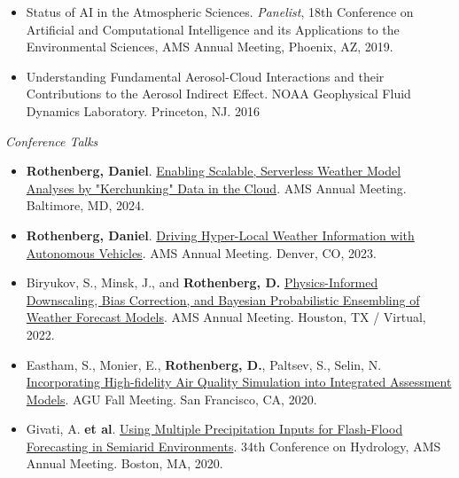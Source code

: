 \documentclass[11pt,letterpaper]{article}
\begin{document}
\begin{itemize}[itemindent=-10pt]
 \item Status of AI in the Atmospheric Sciences. \textit{Panelist}, 18th Conference on Artificial and Computational Intelligence and its Applications to the Environmental Sciences, AMS Annual Meeting, Phoenix, AZ, 2019.
  
\item Understanding Fundamental Aerosol-Cloud Interactions and their Contributions to the Aerosol Indirect Effect. NOAA Geophysical Fluid Dynamics Laboratory. Princeton, NJ. 2016
\end{itemize}

\bigskip
\emph{Conference Talks}
\medskip
\begin{itemize}[itemindent=-10pt]

 \item \textbf{Rothenberg, Daniel}. \href{https://ams.confex.com/ams/104ANNUAL/meetingapp.cgi/Paper/440122}{Enabling Scalable, Serverless Weather Model Analyses by "Kerchunking" Data in the Cloud}. AMS Annual Meeting. Baltimore, MD, 2024.

 \item \textbf{Rothenberg, Daniel}. \href{https://ams.confex.com/ams/103ANNUAL/meetingapp.cgi/Paper/412555}{Driving Hyper-Local Weather Information with Autonomous Vehicles}. AMS Annual Meeting. Denver, CO, 2023.
 
 \item Biryukov, S., Minsk, J., and \textbf{Rothenberg, D.} \href{https://ams.confex.com/ams/102ANNUAL/meetingapp.cgi/Paper/389735}{Physics-Informed Downscaling, Bias Correction, and Bayesian Probabilistic Ensembling of Weather Forecast Models}. AMS Annual Meeting. Houston, TX / Virtual, 2022.

 \item Eastham, S., Monier, E., \textbf{Rothenberg, D.}, Paltsev, S., Selin, N. \href{https://agu.confex.com/agu/fm20/meetingapp.cgi/Paper/740077}{Incorporating High-fidelity Air Quality Simulation into Integrated Assessment Models}. AGU Fall Meeting. San Francisco, CA, 2020.

 \item Givati, A. \textbf{et al}. \href{https://ams.confex.com/ams/2020Annual/meetingapp.cgi/Paper/369441}{Using Multiple Precipitation Inputs for Flash-Flood Forecasting in Semiarid Environments}. 34th Conference on Hydrology, AMS Annual Meeting. Boston, MA, 2020.


\end{itemize}
\end{document}
